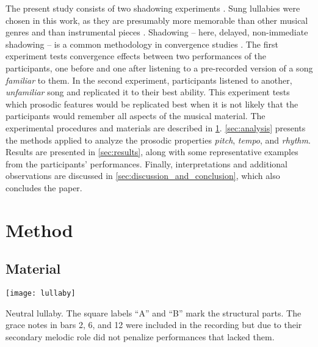 
The present study consists of two shadowing experiments \citep[cf.][]{Goldinger1998echoes}.
Sung lullabies were chosen in this work, as they are presumably more memorable than other musical genres and than instrumental pieces \citep{Weiss2012something, Trehub1991music}.
Shadowing -- here, delayed, non-immediate shadowing -- is a common methodology in convergence studies \cite[e.g.,][]{Pardo2018comparison}.
The first experiment tests convergence effects between two performances of the participants, one before and one after listening to a pre-recorded version of a song \emph{familiar} to them.
In the second experiment, participants listened to another, \emph{unfamiliar} song and replicated it to their best ability.
This experiment tests which prosodic features would be replicated best when it is not likely that the participants would remember all aspects of the musical material.
The experimental procedures and materials are described in \cref{sec:method}.
\cref{sec:analysis} presents the methods applied to analyze the prosodic properties \emph{pitch}, \emph{tempo}, and \emph{rhythm}.
Results are presented in \cref{sec:results}, along with some representative examples from the participants' performances.
Finally, interpretations and additional observations are discussed in \cref{sec:discussion_and_conclusion}, which also concludes the paper.

\section{Method}
\label{sec:method}

\subsection{Material}
\label{subsec:material}

\begin{snippet}[t]
	\centering
	\texttt{[image: lullaby]}
	\caption{Neutral lullaby.
			 The square labels \enquote{A} and \enquote{B} mark the structural parts.
		 	 The grace notes in bars 2, 6, and 12 were included in the recording but due to their secondary melodic role did not penalize performances that lacked them.}
	\label{snippet:uni-lullaby}
\end{snippet}

